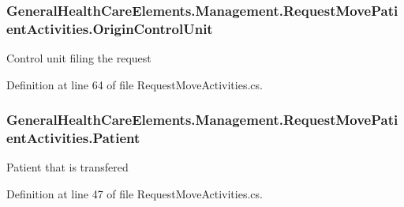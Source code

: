 \subsubsection[{\texorpdfstring{Origin\+Control\+Unit}{OriginControlUnit}}]{ General\+Health\+Care\+Elements.\+Management.\+Request\+Move\+Patient\+Activities.\+Origin\+Control\+Unit\hspace{0.3cm}{\ttfamily [get]}}\hypertarget{class_general_health_care_elements_1_1_management_1_1_request_move_patient_activities_a3c0dba8373877b6a023e3433712f112c}{}\label{class_general_health_care_elements_1_1_management_1_1_request_move_patient_activities_a3c0dba8373877b6a023e3433712f112c}


Control unit filing the request 



Definition at line 64 of file Request\+Move\+Activities.\+cs.

\subsubsection[{\texorpdfstring{Patient}{Patient}}]{ General\+Health\+Care\+Elements.\+Management.\+Request\+Move\+Patient\+Activities.\+Patient\hspace{0.3cm}{\ttfamily [get]}}\hypertarget{class_general_health_care_elements_1_1_management_1_1_request_move_patient_activities_a9f9dd7f3fb05c9b73d420d1136c4d4fa}{}\label{class_general_health_care_elements_1_1_management_1_1_request_move_patient_activities_a9f9dd7f3fb05c9b73d420d1136c4d4fa}


Patient that is transfered 



Definition at line 47 of file Request\+Move\+Activities.\+cs.

